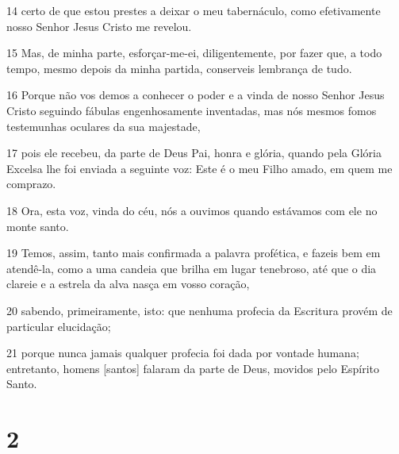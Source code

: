 \par 14 certo de que estou prestes a deixar o meu tabernáculo, como efetivamente nosso Senhor Jesus Cristo me revelou.
\par 15 Mas, de minha parte, esforçar-me-ei, diligentemente, por fazer que, a todo tempo, mesmo depois da minha partida, conserveis lembrança de tudo.
\par 16 Porque não vos demos a conhecer o poder e a vinda de nosso Senhor Jesus Cristo seguindo fábulas engenhosamente inventadas, mas nós mesmos fomos testemunhas oculares da sua majestade,
\par 17 pois ele recebeu, da parte de Deus Pai, honra e glória, quando pela Glória Excelsa lhe foi enviada a seguinte voz: Este é o meu Filho amado, em quem me comprazo.
\par 18 Ora, esta voz, vinda do céu, nós a ouvimos quando estávamos com ele no monte santo.
\par 19 Temos, assim, tanto mais confirmada a palavra profética, e fazeis bem em atendê-la, como a uma candeia que brilha em lugar tenebroso, até que o dia clareie e a estrela da alva nasça em vosso coração,
\par 20 sabendo, primeiramente, isto: que nenhuma profecia da Escritura provém de particular elucidação;
\par 21 porque nunca jamais qualquer profecia foi dada por vontade humana; entretanto, homens [santos] falaram da parte de Deus, movidos pelo Espírito Santo.

\chapter{2}

